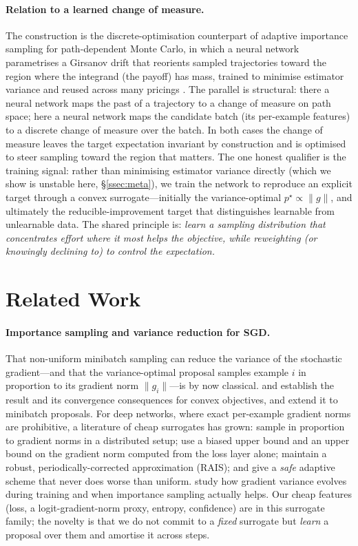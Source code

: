 \documentclass[11pt]{article}
\begin{document}
\paragraph{Relation to a learned change of measure.} The construction is the
discrete-optimisation counterpart of adaptive importance sampling for
path-dependent Monte Carlo, in which a neural network parametrises a Girsanov
drift that reorients sampled trajectories toward the region where the integrand
(the payoff) has mass, trained to minimise estimator variance and reused across
many pricings \citep{virrion2020}. The parallel is structural: there a neural
network maps the past of a trajectory to a change of measure on path space; here
a neural network maps the candidate batch (its per-example features) to a
discrete change of measure over the batch. In both cases the change of measure
leaves the target expectation invariant by construction and is optimised to steer
sampling toward the region that matters. The one honest qualifier is the training
signal: rather than minimising estimator variance directly (which we show is
unstable here, \S\ref{ssec:meta}), we train the network to reproduce an explicit
target through a convex surrogate---initially the variance-optimal
$p^\star\propto\|g\|$, and ultimately the reducible-improvement target that
distinguishes learnable from unlearnable data. The shared principle is:
\emph{learn a sampling distribution that concentrates effort where it most helps
the objective, while reweighting (or knowingly declining to) to control the
expectation.}

\section{Related Work}\label{sec:related}

\paragraph{Importance sampling and variance reduction for SGD.}
That non-uniform minibatch sampling can reduce the variance of the stochastic
gradient---and that the variance-optimal proposal samples example $i$ in
proportion to its gradient norm $\|g_i\|$---is by now classical.
\citet{needell2014} and \citet{zhao2015} establish the result and its convergence
consequences for convex objectives, and \citet{csiba2018} extend it to minibatch
proposals. For deep networks, where exact per-example gradient norms are
prohibitive, a literature of cheap surrogates has grown:
\citet{alain2015} sample in proportion to gradient norms in a distributed setup;
\citet{katharopoulos2017} use a biased upper bound and \citet{katharopoulos2018}
an upper bound on the gradient norm computed from the loss layer alone;
\citet{johnson2018} maintain a robust, periodically-corrected approximation
(RAIS); and \citet{stich2017} give a \emph{safe} adaptive scheme that never does
worse than uniform. \citet{faghri2020} study how gradient variance evolves during
training and when importance sampling actually helps. Our cheap features (loss,
a logit-gradient-norm proxy, entropy, confidence) are in this surrogate family;
the novelty is that we do not commit to a \emph{fixed} surrogate but \emph{learn}
a proposal over them and amortise it across steps.
\end{document}
